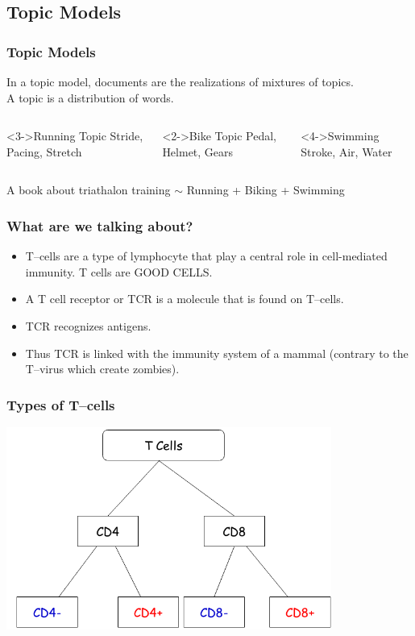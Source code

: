 \documentclass{beamer}
\begin{document}
\subsection{Topic Models}
\begin{frame}
 \frametitle{Topic Models}
In a topic model, documents are the realizations of mixtures of topics. \\ A topic is a distribution of words. 

\begin{columns}
\begin{block}<3->{Running Topic}
Stride, Pacing, Stretch
\end{block}
\begin{block}<2->{Bike Topic}
Pedal, Helmet, Gears
\end{block}
\begin{block}<4->{Swimming}
Stroke, Air, Water
\end{block}
\end{columns}
\begin{itemize}
A book about triathalon training $\sim$ Running + Biking + Swimming
\end{itemize}
\end{frame}



\begin{frame}
 \frametitle{What are we talking about?}
 \begin{itemize}
  \item T--cells are a type of lymphocyte that play a central role in cell-mediated immunity. \alert{T cells are GOOD CELLS}.
  \item A T cell receptor or \alert {TCR} is a molecule that is found on T--cells.
  \item TCR recognizes antigens.
  \item Thus TCR is linked with the immunity system of a mammal (contrary to the T--virus which create zombies).
  \end{itemize}
\end{frame}

\begin{frame}
\frametitle{Types of T--cells}
 \begin{center}
  \includegraphics[width=0.8\textwidth]{TCELLS}
 \end{center}
\end{frame}
\end{document}

